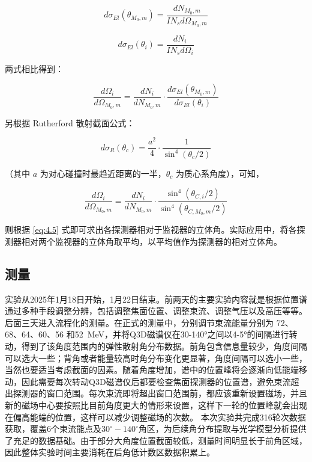 \begin{equation}
d\sigma_{El}(\theta_{M_0,m}) = \frac{dN_{M_0,m}}{IN_s d\Omega_{M_0,m}} 
\end{equation}

\begin{equation}
d\sigma_{El}(\theta_i) = \frac{dN_i}{IN_s d\Omega_i}
\end{equation}

两式相比得到：

\begin{equation}
\frac{d\Omega_i}{d\Omega_{M_0,m}} = \frac{dN_i}{dN_{M_0,m}} \cdot \frac{d\sigma_{El}(\theta_{M_0,m})}{d\sigma_{El}(\theta_i)}
\end{equation}

另根据 Rutherford 散射截面公式：

\begin{equation}
d\sigma_R(\theta_c) = \frac{a^2}{4} \cdot \frac{1}{\sin^4(\theta_c / 2)}
\end{equation}

（其中 \( a \) 为对心碰撞时最趋近距离的一半，\( \theta_c \) 为质心系角度），可知，

\begin{equation}
\frac{d\Omega_i}{d\Omega_{M_0,m}} = \frac{dN_i}{dN_{M_0,m}} \cdot \frac{\sin^4(\theta_{C,i}/2)}{\sin^4(\theta_{C,M_0,m}/2)}
\label{eq:4.5}
\end{equation}

则根据 \eqref{eq:4.5} 式即可求出各探测器相对于监视器的立体角。实际应用中，将各探测器相对两个监视器的立体角取平均，以平均值作为探测器的相对立体角。
\subsection{测量}
实验从2025年1月18日开始，1月22日结束。前两天的主要实验内容就是根据位置谱通过多种手段调整分辨，包括调整焦面位置、调整束流、调整气压以及高压等等。后面三天进入流程化的测量。在正式的测量中，分别调节束流能量分别为 72、68、64、60、56 和52~MeV，并将Q3D磁谱仪在30-140°之间以4-5°的间隔进行转动，得到了该角度范围内的弹性散射角分布数据。前角包含信息量较少，角度间隔可以选大一些；背角或者能量较高时角分布变化更显著，角度间隔可以选小一些，当然也要适当考虑截面的因素。随着角度增加，谱中的位置峰将会逐渐向低能端移动，因此需要每次转动Q3D磁谱仪后都要检查焦面探测器的位置谱，避免束流超出探测器的窗口范围。每次束流即将超出窗口范围前，都应该重新设置磁场，并且新的磁场中心要按照比目前角度更大的情形来设置，这样下一轮的位置峰就会出现在偏高能端的位置，这样可以减少调整磁场的次数。
本次实验共完成316轮次数据获取，覆盖6个束流能点及$30^\circ\!-\!140^\circ$角区，为后续角分布提取与光学模型分析提供了充足的数据基础。由于部分大角度位置截面较低，测量时间明显长于前角区域，因此整体实验时间主要消耗在后角低计数区数据积累上。

